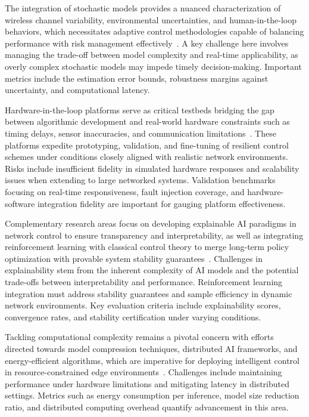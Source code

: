 \documentclass[sigconf]{acmart}
\begin{document}
The integration of stochastic models provides a nuanced characterization of wireless channel variability, environmental uncertainties, and human-in-the-loop behaviors, which necessitates adaptive control methodologies capable of balancing performance with risk management effectively~\cite{ref46}. A key challenge here involves managing the trade-off between model complexity and real-time applicability, as overly complex stochastic models may impede timely decision-making. Important metrics include the estimation error bounds, robustness margins against uncertainty, and computational latency.

Hardware-in-the-loop platforms serve as critical testbeds bridging the gap between algorithmic development and real-world hardware constraints such as timing delays, sensor inaccuracies, and communication limitations~\cite{ref46}. These platforms expedite prototyping, validation, and fine-tuning of resilient control schemes under conditions closely aligned with realistic network environments. Risks include insufficient fidelity in simulated hardware responses and scalability issues when extending to large networked systems. Validation benchmarks focusing on real-time responsiveness, fault injection coverage, and hardware-software integration fidelity are important for gauging platform effectiveness.

Complementary research areas focus on developing explainable AI paradigms in network control to ensure transparency and interpretability, as well as integrating reinforcement learning with classical control theory to merge long-term policy optimization with provable system stability guarantees~\cite{ref50}. Challenges in explainability stem from the inherent complexity of AI models and the potential trade-offs between interpretability and performance. Reinforcement learning integration must address stability guarantees and sample efficiency in dynamic network environments. Key evaluation criteria include explainability scores, convergence rates, and stability certification under varying conditions.

Tackling computational complexity remains a pivotal concern with efforts directed towards model compression techniques, distributed AI frameworks, and energy-efficient algorithms, which are imperative for deploying intelligent control in resource-constrained edge environments~\cite{ref49}. Challenges include maintaining performance under hardware limitations and mitigating latency in distributed settings. Metrics such as energy consumption per inference, model size reduction ratio, and distributed computing overhead quantify advancement in this area.
\end{document}
